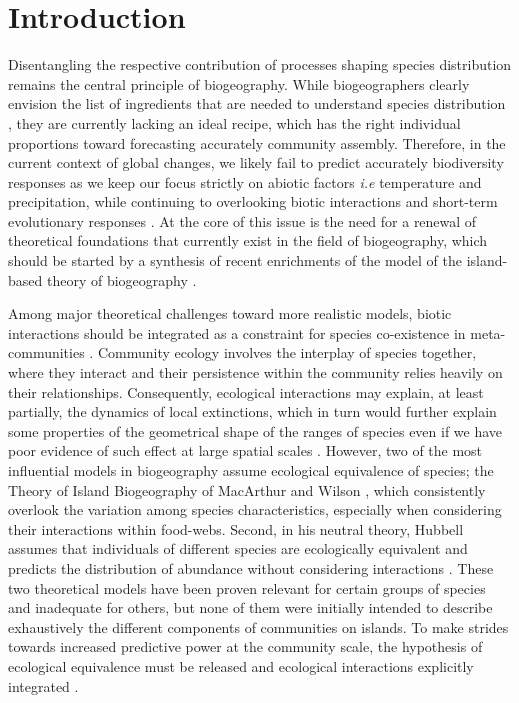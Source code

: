 \section{Introduction}\label{introduction}

Disentangling the respective contribution of processes shaping species
distribution remains the central principle of biogeography. While
biogeographers clearly envision the list of ingredients that are needed
to understand species distribution \citep{Thuiller2013}, they are
currently lacking an ideal recipe, which has the right individual
proportions toward forecasting accurately community assembly. Therefore,
in the current context of global changes, we likely fail to predict
accurately biodiversity responses as we keep our focus strictly on
abiotic factors \emph{i.e} temperature and precipitation, while
continuing to overlooking biotic interactions and short-term
evolutionary responses \citep{Lavergne2010}. At the core of this issue
is the need for a renewal of theoretical foundations that currently
exist in the field of biogeography, which should be started by a
synthesis of recent enrichments of the model of the island-based theory
of biogeography \citep{Lomolino2000a, Warren2015}.

Among major theoretical challenges toward more realistic models, biotic
interactions should be integrated as a constraint for species
co-existence in meta-communities \citep{Jabot2012, Cazelles2015a}.
Community ecology involves the interplay of species together, where they
interact and their persistence within the community relies heavily on
their relationships. Consequently, ecological interactions may explain,
at least partially, the dynamics of local extinctions, which in turn
would further explain some properties of the geometrical shape of the
ranges of species \citep[\emph{e.g.} nested distributions of parasitoid
and its host,][]{Shenbrot2007t} even if we have poor evidence of such
effect at large spatial scales \citep[but see][]{Gotelli2010}. However,
two of the most influential models in biogeography assume ecological
equivalence of species; the Theory of Island Biogeography of MacArthur
and Wilson \citep[hereafter TIB,][]{MacArthur1967}, which consistently
overlook the variation among species characteristics, especially when
considering their interactions within food-webs. Second, in his neutral
theory, Hubbell assumes that individuals of different species are
ecologically equivalent and predicts the distribution of abundance
without considering interactions \citep{Hubbell1997}. These two
theoretical models have been proven relevant for certain groups of
species and inadequate for others, but none of them were initially
intended to describe exhaustively the different components of
communities on islands. To make strides towards increased predictive
power at the community scale, the hypothesis of ecological equivalence
must be released and ecological interactions explicitly integrated
\citep{Holt2010, Gravel2011}.


